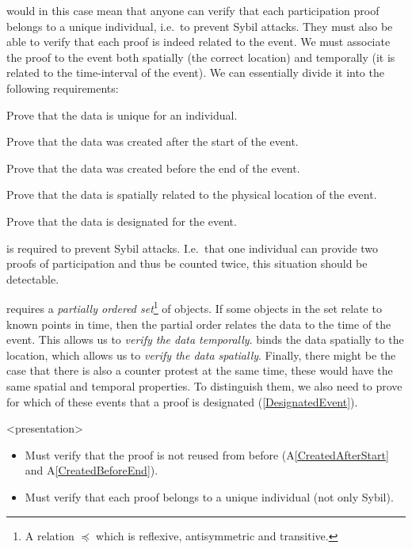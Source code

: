  would in this case mean that anyone can verify that 
each participation proof belongs to a unique individual, i.e.\ to prevent Sybil 
attacks.
They must also be able to verify that each proof is indeed related to the 
event.
We must associate the proof to the event both spatially (the correct location) 
and temporally (it is related to the time-interval of the event).
We can essentially divide it into the following requirements:
\begin{frame}
\begin{requirements}
  \item\label{UniqueIndividual} Prove that the data is unique for an 
    individual.
  \item\label{CreatedAfterStart} Prove that the data was created after the 
    start of the event.
  \item\label{CreatedBeforeEnd} Prove that the data was created before the end 
    of the event.
  \item\label{SpatiallyRelated} Prove that the data is spatially related to the 
    physical location of the event.
  \item\label{DesignatedEvent} Prove that the data is designated for the event.
\end{requirements}
\end{frame}

 is required to prevent Sybil attacks.
I.e.\ that one individual can provide two proofs of participation and thus be 
counted twice, this situation should be detectable.

 requires a \emph{partially ordered 
  set}\footnote{%
  A relation \(\preceq\) which is reflexive, antisymmetric and transitive.
} of objects.
If some objects in the set relate to known points in time, then the partial 
order relates the data to the time of the event.
This allows us to \emph{verify the data temporally}.
 binds the data spatially to the location, which allows 
us to \emph{verify the data spatially}.
Finally, there might be the case that there is also a counter protest at the 
same time, these would have the same spatial and temporal properties.
To distinguish them, we also need to prove for which of these events that a 
proof is designated (\cref{DesignatedEvent}).

\begin{frame}<presentation>
  \begin{idea}
    \begin{itemize}
      \item Must verify that the proof is not reused from before 
        (A\ref{CreatedAfterStart} and A\ref{CreatedBeforeEnd}).
      \item Must verify that each proof belongs to a unique individual (not 
        only Sybil).
    \end{itemize}
  \end{idea}
\end{frame}

